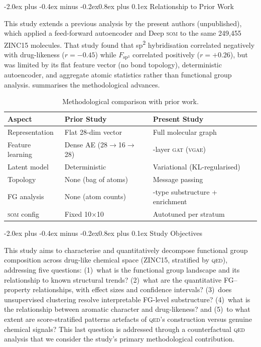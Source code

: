 \documentclass[10pt,a4paper,twocolumn]{article}
\makeatletter
\providecommand{\qed}{}
\let\qed\relax
\newcommand{\vgae}{\textsc{vgae}}
\newcommand{\gat}{\textsc{gat}}
\newcommand{\som}{\textsc{som}}
\newcommand{\qedscore}{\textsc{qed}}
\let\qed\qedscore
\newcommand{\fspthree}{\ensuremath{F_{\mathrm{sp}^3}}}
\renewcommand\subsection{\@startsection{subsection}{2}{\z@}%
  {-2.0ex plus -0.4ex minus -0.2ex}{0.8ex plus 0.1ex}%
  {\normalfont\large\bfseries}}
\makeatother
\begin{document}
\subsection{Relationship to Prior Work}

This study extends a previous analysis by the present authors (unpublished), which applied a feed-forward autoencoder and Deep \som{} to the same 249,455 ZINC15 molecules. That study found that sp\textsuperscript{2} hybridisation correlated negatively with drug-likeness ($r = -0.45$) while \fspthree{} correlated positively ($r = +0.26$), but was limited by its flat feature vector (no bond topology), deterministic autoencoder, and aggregate atomic statistics rather than functional group analysis.  summarises the methodological advances.

\begin{table}[tbp]
\centering
\caption{Methodological comparison with prior work.}
\label{tab:comparison}
\small
\begin{tabularx}{\columnwidth}{@{}l>{\raggedright\arraybackslash}X>{\raggedright\arraybackslash}X@{}}
\toprule
\textbf{Aspect} & \textbf{Prior Study} & \textbf{Present Study} \\
\midrule
Representation & Flat 28-dim vector & Full molecular graph \\
Feature learning & Dense AE (28$\to$16$\to$28) & 3-layer \gat{} (\vgae{}) \\
Latent model & Deterministic & Variational (KL-regularised) \\
Topology & None (bag of atoms) & Message passing \\
FG analysis & None (atom counts) & 22-type substructure + enrichment \\
\som{} config & Fixed 10$\times$10 & Autotuned per stratum \\
\bottomrule
\end{tabularx}
\end{table}

\subsection{Study Objectives}

This study aims to characterise and quantitatively decompose functional group composition across drug-like chemical space (ZINC15, stratified by \qed{}), addressing five questions: (1)~what is the functional group landscape and its relationship to known structural trends? (2)~what are the quantitative FG--property relationships, with effect sizes and confidence intervals? (3)~does unsupervised clustering resolve interpretable FG-level substructure? (4)~what is the relationship between aromatic character and drug-likeness? and (5)~to what extent are score-stratified patterns artefacts of \qed{}'s construction versus genuine chemical signals? This last question is addressed through a counterfactual \qed{} analysis that we consider the study's primary methodological contribution.
\end{document}
